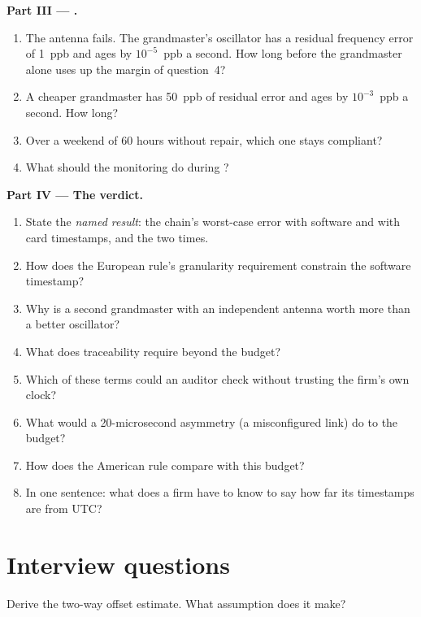 \begin{problem}
\medskip\noindent\textbf{Part III --- .}
\begin{enumerate}[resume]
\item The antenna fails. The grandmaster's oscillator has a residual frequency error of 1~ppb and ages by $10^{-5}$~ppb a second. How
  long before the grandmaster alone uses up the margin of question~4?
\item A cheaper grandmaster has 50~ppb of residual error and ages by $10^{-3}$~ppb a second. How long?
\item Over a weekend of 60 hours without repair, which one stays compliant?
\item What should the monitoring do during ?
\end{enumerate}

\medskip\noindent\textbf{Part IV --- The verdict.}
\begin{enumerate}[resume]
\item State the \emph{named result}: the chain's worst-case error with software and with card timestamps, and the two  times.
\item How does the European rule's granularity requirement constrain the software timestamp?
\item Why is a second grandmaster with an independent antenna worth more than a better oscillator?
\item What does traceability require beyond the budget?
\item Which of these terms could an auditor check without trusting the firm's own clock?
\item What would a 20-microsecond asymmetry (a misconfigured link) do to the budget?
\item How does the American rule compare with this budget?
\item In one sentence: what does a firm have to know to say how far its timestamps are from UTC?
\end{enumerate}
\end{problem}

\section{Interview questions}

\begin{interviewq}\label{iq:nw:time-synchronisation:1}
Derive the two-way offset estimate. What assumption does it make?
\end{interviewq}

